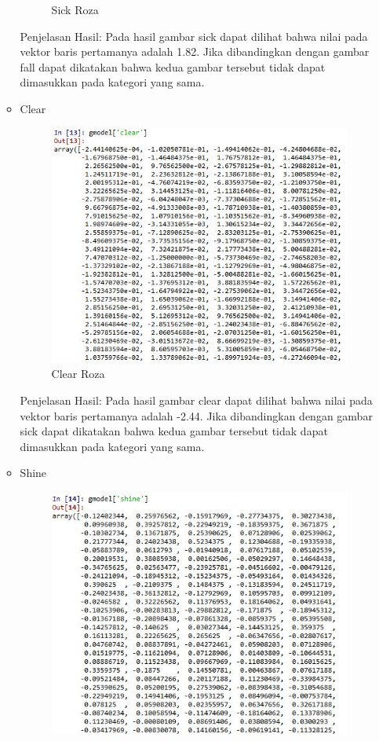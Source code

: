 \begin{enumerate}
\begin{itemize}
\begin{figure}[!hbtp]
\caption{Sick Roza}
\label{text-fadila}
\end{figure}
\par Penjelasan Hasil: Pada hasil gambar sick dapat dilihat bahwa nilai pada vektor baris pertamanya adalah 1.82. Jika dibandingkan dengan gambar fall dapat dikatakan bahwa kedua gambar tersebut tidak dapat dimasukkan pada kategori yang sama.
\item Clear
\begin{figure}[!hbtp]
\centering
\includegraphics[scale=0.6]{figures/clearroza.jpg}
\caption{Clear Roza}
\label{text-fadila}
\end{figure}
\par Penjelasan Hasil: Pada hasil gambar clear dapat dilihat bahwa nilai pada vektor baris pertamanya adalah -2.44. Jika dibandingkan dengan gambar sick dapat dikatakan bahwa kedua gambar tersebut tidak dapat dimasukkan pada kategori yang sama.
\item Shine
\begin{figure}[!hbtp]
\centering
\includegraphics[scale=0.6]{figures/shineroza.jpg}

\end{figure}
\end{itemize}
\end{enumerate}
